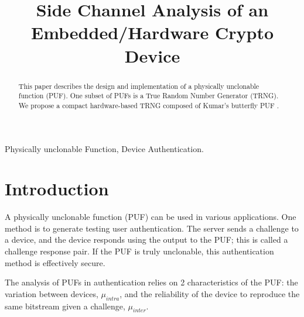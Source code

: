
\usepackage{tikz}
\usetikzlibrary{shapes}
\usepackage{verbatim}
\usepackage{listings}


\title{Side Channel Analysis of an Embedded/Hardware Crypto Device}

\author{
}

\maketitle


\begin{abstract}
%
	This paper describes the design and implementation of a physically unclonable function (PUF). One subset of PUFs is a True Random Number Generator (TRNG). We propose a compact hardware-based TRNG composed of Kumar's butterfly PUF \cite{Kumar2008}. 
 
\end{abstract}

\begin{IEEEkeywords}
Physically unclonable Function, Device Authentication.
\end{IEEEkeywords}

\section{Introduction}
	A physically unclonable function (PUF) can be used in various applications. One method is to generate testing user authentication. The server sends a challenge to a device, and the device responds using the output to the PUF; this is called a challenge response pair. If the PUF is truly unclonable, this authentication method is effectively secure. 

	The analysis of PUFs in authentication relies on 2 characteristics of the PUF: the variation between devices, $\mu_{intra}$, and the reliability of the device to reproduce the same bitstream given a challenge, $\mu_{inter}$. 

